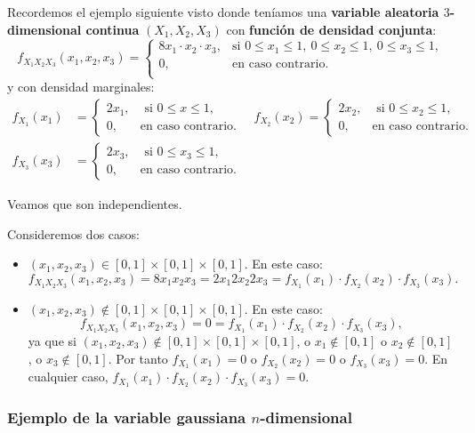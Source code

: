 \documentclass[
  letterpaper,
  DIV=11,
  numbers=noendperiod]{scrreprt}
\begin{document}
Recordemos el ejemplo siguiente visto donde teníamos una
\textbf{variable aleatoria \(3\)-dimensional continua} \((X_1,X_2,X_3)\)
con \textbf{función de densidad conjunta}: \[
f_{X_1X_2X_3}(x_1,x_2,x_3)=\begin{cases}
8 x_1\cdot x_2\cdot x_3, & \mbox{si }0\leq x_1\leq 1,\ 0\leq x_2\leq 1,\ 0\leq x_3\leq 1, \\
0, & \mbox{en caso contrario.}\\
\end{cases}
\] y con densidad marginales: \[
\begin{array}{rl}
f_{X_1}(x_1) & =\begin{cases}
2x_1, & \mbox{ si }0\leq x\leq 1,\\
0, & \mbox{en caso contrario.}
\end{cases}\quad f_{X_2}(x_2)=\begin{cases}
2x_2, & \mbox{ si }0\leq x_2\leq 1,\\
0, & \mbox{en caso contrario.}
\end{cases}\\ f_{X_3}(x_3) & =\begin{cases}
2x_3, & \mbox{ si }0\leq x_3\leq 1,\\
0, & \mbox{en caso contrario.}
\end{cases}
\end{array}
\]

Veamos que son independientes.

Consideremos dos casos:

\begin{itemize}
\item
  \((x_1,x_2,x_3)\in [0,1]\times [0,1]\times [0,1]\). En este caso: \[
  f_{X_1X_2X_3}(x_1,x_2,x_3) =8 x_1 x_2 x_3 =2 x_1 2 x_2 2 x_3=f_{X_1}(x_1)\cdot f_{X_2}(x_2)\cdot f_{X_3}(x_3).
  \]
\item
  \((x_1,x_2,x_3)\not\in [0,1]\times [0,1]\times [0,1]\). En este caso:
  \[
  f_{X_1X_2X_3}(x_1,x_2,x_3)  =0 = f_{X_1}(x_1)\cdot f_{X_2}(x_2)\cdot f_{X_3}(x_3),
  \] ya que si \((x_1,x_2,x_3)\not\in [0,1]\times [0,1]\times [0,1]\), o
  \(x_1\not\in [0,1]\) o \(x_2\not\in [0,1]\), o \(x_3\not\in [0,1]\).
  Por tanto \(f_{X_1}(x_1)=0\) o \(f_{X_2}(x_2)=0\) o
  \(f_{X_3}(x_3)=0\). En cualquier caso,
  \(f_{X_1}(x_1)\cdot f_{X_2}(x_2)\cdot f_{X_3}(x_3)=0\).
\end{itemize}

\hypertarget{ejemplo-de-la-variable-gaussiana-n-dimensional}{%
\subsubsection{\texorpdfstring{Ejemplo de la variable gaussiana
\(n\)-dimensional}{Ejemplo de la variable gaussiana n-dimensional}}\label{ejemplo-de-la-variable-gaussiana-n-dimensional}}
\end{document}
